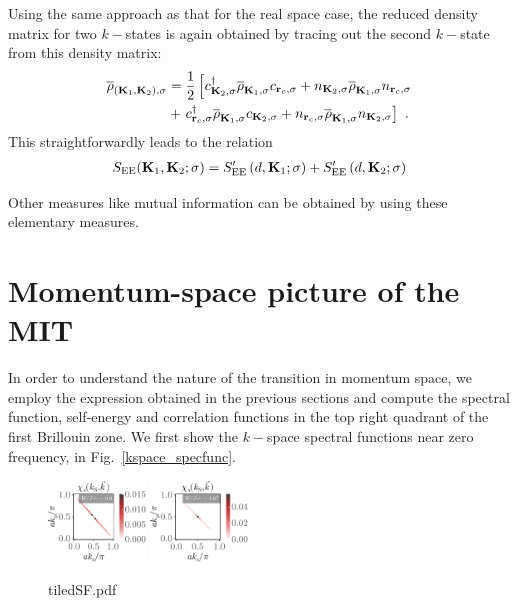 \documentclass[reprint,hidelinks]{revtex4-2}
\begin{document}
Using the same approach as that for the real space case, the reduced density matrix for two \(k-\)states is again obtained by tracing out the second \(k-\)state from this density matrix:
\begin{equation}\begin{aligned}
	\overline\rho_{({\bf K}_1, {\bf K}_2),\sigma} &= \frac{1}{2}\left[c^\dagger_{{\bf K}_2,\sigma} \overline\rho_{{\bf K}_1,\sigma} c_{{\bf r}_c,\sigma} + n_{{\bf K}_2,\sigma} \overline\rho_{{\bf K}_1,\sigma} n_{{\bf r}_c,\sigma} \right.\\
	&+ \left. c^\dagger_{{\bf r}_c,\sigma} \overline\rho_{{\bf K}_1,\sigma} c_{{\bf K}_2,\sigma} + n_{{\bf r}_c,\sigma} \overline\rho_{{\bf K}_1,\sigma} n_{{\bf K}_2,\sigma}\right] ~.
\end{aligned}\end{equation}
This straightforwardly leads to the relation
\begin{equation}\begin{aligned}
	S_\text{EE}({\bf K}_1,{\bf K}_2;\sigma) = S^\prime_\text{EE}\left(d, {\bf K}_1;\sigma\right) + S^\prime_\text{EE}\left(d, {\bf K}_2;\sigma\right)
\end{aligned}\end{equation}


Other measures like mutual information can be obtained by using these elementary measures.

\section{Momentum-space picture of the MIT}
In order to understand the nature of the transition in momentum space, we employ the expression obtained in the previous sections and compute the spectral function, self-energy and correlation functions in the top right quadrant of the first Brillouin zone. We first show the \(k-\)space spectral functions near zero frequency, in Fig.~\ref{kspace_specfunc}.
\begin{figure}[htpb]
	\centering
	\includegraphics[width=0.23\textwidth]{tiledSF-1.pdf}
	\includegraphics[width=0.23\textwidth]{tiledSF-2.pdf}
	\caption{tiledSF.pdf}
	\label{fig:tiledSF-pdf}
\end{figure}
\end{document}
